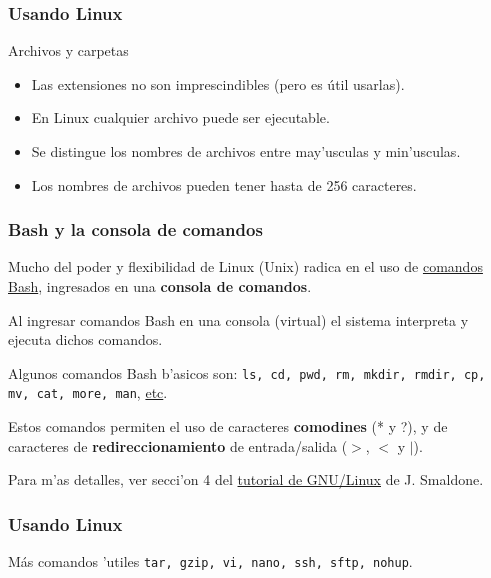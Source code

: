 \documentclass[hyperref={colorlinks}]{beamer}
\begin{document}
\begin{frame}\frametitle{Usando Linux}
\begin{block}{Archivos y carpetas}
\begin{itemize}
\item Las extensiones no son imprescindibles (pero es útil usarlas).
\item En Linux cualquier archivo puede ser ejecutable.
\item Se distingue los nombres de archivos entre may'usculas y min'usculas.
\item Los nombres de archivos pueden tener hasta de 256 caracteres.
\end{itemize}
\end{block}
\end{frame}


\begin{frame}\frametitle{Bash y la consola de comandos}
\begin{block}{}
Mucho del poder y flexibilidad de Linux (Unix) radica en el uso de \href{https://es.wikipedia.org/wiki/Comandos_Bash}{comandos Bash}, ingresados en una \textbf{consola de comandos}.

Al ingresar comandos Bash en una consola (virtual) el sistema interpreta y ejecuta dichos comandos.
\end{block}
\begin{block}{}
Algunos comandos Bash b'asicos son: \texttt{ls, cd, pwd, rm, mkdir, rmdir, cp, mv, cat, more, man}, \href{https://es.wikipedia.org/wiki/Comandos_Bash}{etc}.
\end{block}

\begin{block}{}
Estos comandos permiten el uso de caracteres \textbf{comodines} (* y ?), y de caracteres de \textbf{redireccionamiento} de entrada/salida ($>$, $<$ y $|$).
\end{block}

\begin{block}{}
Para m'as detalles, ver secci'on 4 del \href{http://www.smaldone.com.ar/documentos/misdocumentos.shtml}{tutorial de GNU/Linux} de J. Smaldone.
\end{block}
\end{frame}

\begin{frame}\frametitle{Usando Linux}
\begin{block}{M\'as comandos 'utiles}
\texttt{tar, gzip, vi, nano, ssh, sftp, nohup}.
\end{block}
\end{frame}
\end{document}
